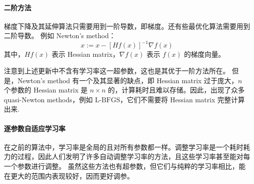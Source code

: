 \paragraph{二阶方法}

梯度下降及其延伸算法只需要用到一阶导数，即梯度。还有些最优化算法需要用到二阶导数。
例如 Newton's method：
\[
x:=x-[Hf(x)]^{-1}\nabla f(x)
\]
其中，$Hf(x)$ 表示 Hessian matrix，$\nabla f(x)$ 表示 $f(x)$ 的梯度向量。

注意到上述更新中不含有学习率这一超参数，这也是其优于一阶方法所在。
但是，Newton's method 有一个及其显著的缺点，即 Hessian matrix 过于庞大，$n$ 个参数的 Hessian matrix 是 $n\times n$ 的，计算耗时且难以存储。因此，出现了众多 quasi-Newton methods，例如 $\text{L-BFGS}$，它们不需要将 Hessian matrix 完整计算出来.

\paragraph{逐参数自适应学习率}

在之前的算法中，学习率是全局的且对所有参数都一样。调整学习率是一个耗时耗力的过程，因此人们发明了许多自动调整学习率的方法，且这些学习率甚至能对每一个参数进行调整。
虽然这些方法也有超参数，但它们与纯粹的学习率相比，能在更大的范围内表现较好，因而更好调参。

